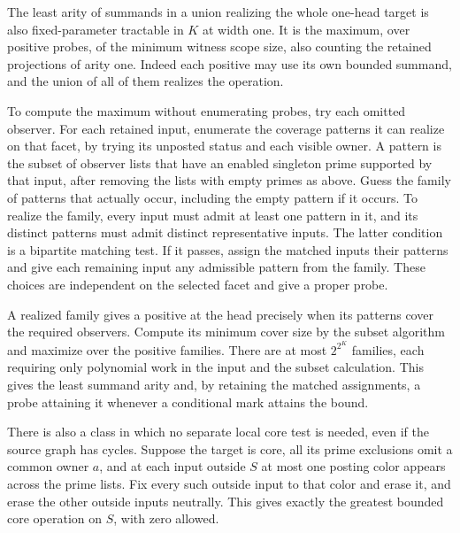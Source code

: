 The least arity of summands in a union
realizing the whole one-head target is also
fixed-parameter tractable in $K$ at width one.
It is the maximum, over positive probes,
of the minimum witness scope size, also
counting the retained projections of arity
one. Indeed each positive may use its own
bounded summand, and the union of all of
them realizes the operation.

To compute the maximum without enumerating
probes, try each omitted observer. For each
retained input, enumerate the coverage
patterns it can realize on that facet,
by trying its unposted status and each
visible owner. A pattern is the subset
of observer lists that have an enabled
singleton prime supported by that input,
after removing the lists with empty
primes as above. Guess the family of
patterns that actually occur, including
the empty pattern if it occurs. To realize
the family, every input must admit at
least one pattern in it, and its distinct
patterns must admit distinct representative
inputs. The latter condition is a bipartite
matching test. If it passes, assign the
matched inputs their patterns and give
each remaining input any admissible
pattern from the family. These choices
are independent on the selected facet
and give a proper probe.

A realized family gives a positive at the
head precisely when its patterns cover
the required observers. Compute its
minimum cover size by the subset algorithm
and maximize over the positive families.
There are at most $2^{2^K}$ families, each
requiring only polynomial work in the input
and the subset calculation. This gives the
least summand arity and, by retaining the
matched assignments, a probe attaining it
whenever a conditional mark attains the
bound.

There is also a class in which no separate local core
test is needed, even if the source graph has cycles.
Suppose the target is core, all its prime exclusions
omit a common owner $a$, and at each input outside
$S$ at most one posting color appears across the
prime lists. Fix every such outside input to that
color and erase it, and erase the other outside
inputs neutrally. This gives exactly the greatest
bounded core operation on $S$, with zero allowed.

